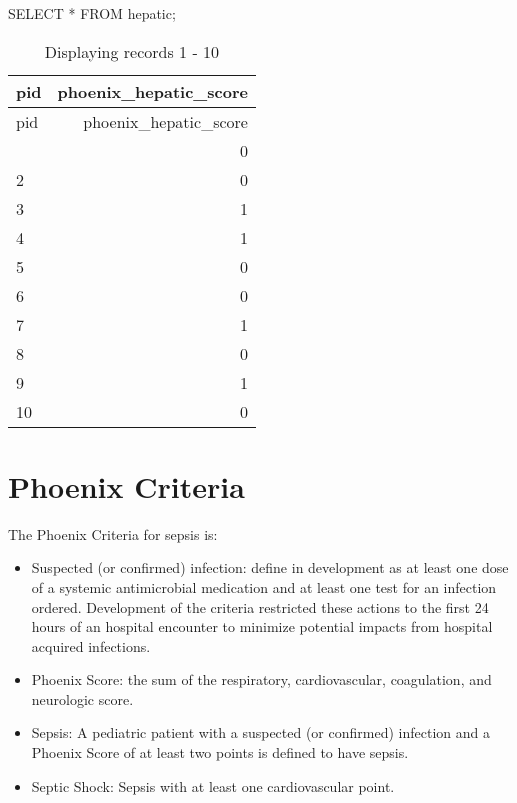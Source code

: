 \documentclass[
  letterpaper,
  DIV=11,
  numbers=noendperiod]{scrartcl}
\newenvironment{Shaded}{\begin{snugshade}}{\end{snugshade}}
\newcommand{\KeywordTok}[1]{\textcolor[rgb]{0.00,0.23,0.31}{#1}}
\newcommand{\NormalTok}[1]{\textcolor[rgb]{0.00,0.23,0.31}{#1}}
\newcommand{\OperatorTok}[1]{\textcolor[rgb]{0.37,0.37,0.37}{#1}}
\begin{document}
\begin{Shaded}
\begin{Highlighting}[]
\KeywordTok{SELECT} \OperatorTok{*} \KeywordTok{FROM}\NormalTok{ hepatic;}
\end{Highlighting}
\end{Shaded}

\begin{longtable}[]{@{}lr@{}}
\caption{Displaying records 1 - 10}\tabularnewline
\toprule\noalign{}
pid & phoenix\_hepatic\_score \\
\midrule\noalign{}
\endfirsthead
\toprule\noalign{}
pid & phoenix\_hepatic\_score \\
\midrule\noalign{}
\endhead
\bottomrule\noalign{}
\endlastfoot
1 & 0 \\
2 & 0 \\
3 & 1 \\
4 & 1 \\
5 & 0 \\
6 & 0 \\
7 & 1 \\
8 & 0 \\
9 & 1 \\
10 & 0 \\
\end{longtable}

\section{Phoenix Criteria}\label{phoenix-criteria}

The Phoenix Criteria for sepsis is:

\begin{itemize}
\item
  Suspected (or confirmed) infection: define in development as at least
  one dose of a systemic antimicrobial medication and at least one test
  for an infection ordered. Development of the criteria restricted these
  actions to the first 24 hours of an hospital encounter to minimize
  potential impacts from hospital acquired infections.
\item
  Phoenix Score: the sum of the respiratory, cardiovascular,
  coagulation, and neurologic score.
\item
  Sepsis: A pediatric patient with a suspected (or confirmed) infection
  and a Phoenix Score of at least two points is defined to have sepsis.
\item
  Septic Shock: Sepsis with at least one cardiovascular point.
\end{itemize}
\end{document}
